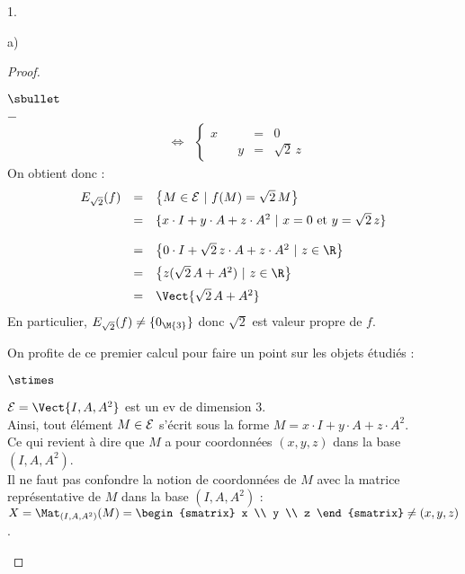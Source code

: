 \begin{noliste}{1.}
\begin{noliste}{a)}
\begin{proof}
\begin{noliste}{$\sbullet$}
\begin{noliste}{$-$}
\[\begin{array}{rcl}
      & \Longleftrightarrow & \left\{
      \begin{array}{rrrcl}
       x & & & = & 0\\
       & & y & = & \sqrt{2} \, z
      \end{array}
      \right.
     \end{array}
    \]
    On obtient donc :
    \[
     \begin{array}{rcl}
      E_{\sqrt{2}}(f) & = & \left\{ M\in\mathcal{E} \ | \ f(M)= 
      \sqrt{2}\, M \right\}
      \\[.2cm]
      & = & \{ x \cdot I+y \cdot A+z \cdot A^2 \ | \
       x = 0 \mbox{ et }
       y = \sqrt{2} \, z
      \}
      \\[.4cm]
      & = & \left\{ 0\cdot I + \sqrt{2} \, z \cdot A + z \cdot A^2 
      \ | \ z\in\R\right\}
      \\[.2cm]
      & = & \left\{ z(\sqrt{2} \, A + A^2) 
      \ | \ z\in\R\right\}
      \\[.2cm]
      & = & \Vect{\sqrt{2} \, A+A^2}
     \end{array}
    \]
    En particulier, $E_{\sqrt{2}}(f)\neq \{0_{\M{3}}\}$ donc $\sqrt{2}$ 
    est valeur propre de $f$.
    \end{noliste}
          
    \newpage
          
    \begin{remark}%
          On profite de ce premier calcul pour faire un point sur les
          objets étudiés :
          \begin{noliste}{$\stimes$}
            \setlength{\itemsep}{2mm}
          \item ${\cal E} = \Vect{I, A, A^2}$ est un ev de dimension
            $3$.\\[.2cm]
            Ainsi, tout élément $M \in {\cal E}$ s'écrit sous la
            forme $M = x \cdot I + y \cdot A + z \cdot A^2$.\\[.2cm]
            Ce qui revient à dire que $M$ a pour coordonnées
            $(x, y, z)$ dans la base $(I, A, A^2)$.\\[.2cm]
            Il ne faut pas confondre la notion de coordonnées de $M$
            avec la matrice représentative de $M$ dans la base $(I, A,
            A^2)$ : $X = \Mat_{(I,A, A^2)}(M) =
            \begin{smatrix}
              x \\
              y \\
              z
            \end{smatrix}
            \neq (x, y, z)
            $.


\end{noliste}
\end{remark}
\end{noliste}
\end{proof}
\end{noliste}
\end{noliste}
